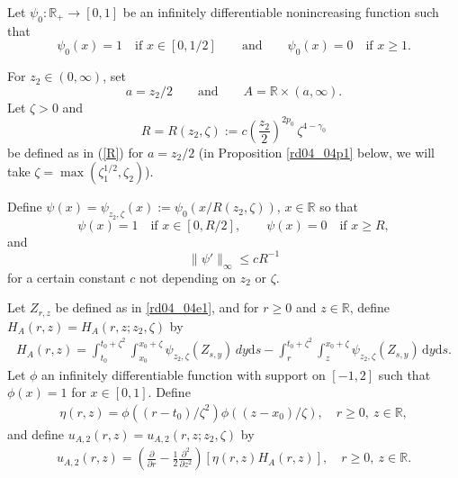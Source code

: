 \documentclass[12pt,a4paper]{article}
\newcommand{\R}{{\mathbb{R}}}
\renewcommand{\d}{\mathrm{d}}
\newcommand {\deltah}{{\zeta}}
\newcommand{\<}{\langle}
\renewcommand{\>}{\rangle}
\begin{document}
 Let $\psi_0:\mathbb{R}_+ \rightarrow [0,1]$ be an infinitely differentiable nonincreasing function such that
 \[
 \psi_0(x)= 1 \quad\text{if } x \in [0, 1/2] \qquad\text{and}\qquad \psi_0(x)= 0 \quad\text{if } x \geq 1.
 \]
 
 For $z_2\in (0,\infty)$, set 
 \begin{equation}\label{rd04_04e2}
      a=z_2/2\qquad \text{and}\qquad A=\R \times (a,\infty).
 \end{equation}
 Let $\zeta > 0$ and
 \begin{equation}\label{rd08_04e2}
    R=R(z_2,\deltah) := c \left(\frac{z_2}{2}\right)^{2 p_0}\, \zeta^{4 - \gamma_0}
  \end{equation}
 be defined as in (\ref{R}) for $a=z_2/2$ (in Proposition \ref{rd04_04p1} below, we will take $\zeta=\max(\zeta_1^{1/2}, \zeta_2)$).
 
 Define $\psi(x) = \psi_{z_2,\deltah}(x) := \psi_0(x/R(z_2, \deltah))$, $x\in \mathbb{R}$ so that
  \[
 \psi(x)= 1 \quad\text{if } x \in [0, R/2], \qquad \psi(x)= 0 \quad\text{if } x \geq R,
 \]
 and 
 \begin{equation}\label{rd07_02e1}
    \|\psi'\|_\infty \le cR^{-1}
\end{equation}
for a certain constant $c$ not depending on $z_2$ or $\deltah$.

Let $Z_{r, z}$ be defined as in \eqref{rd04_04e1}, and for $r\geq0$ and $z\in \R$, define $H_A(r, z) = H_A(r, z; z_2, \deltah)$ by
 \begin{align}\label{eq:H}
 H_A(r,z)= \int_{t_0}^{t_0+\deltah^2}\int_{x_0}^{x_0+\deltah}\psi_{z_2, \deltah}(Z_{s,y})\, d y\d s- \int_{r}^{t_0+\deltah^2}\int_{z}^{x_0+\deltah}\psi_{z_2, \deltah}(Z_{s,y})\, \d y\d s. 
 \end{align}
 Let $\phi$ an infinitely differentiable function with support on $[-1,2]$ such that $\phi(x)=1$ for $x \in [0,1]$.
Define 
\begin{align}\label{eq:eta}
\eta(r, z)= \phi\left((r-t_0)/\deltah^2\right) \phi\left((z-x_0)/\deltah\right), \quad r\geq0,\ z\in \R,
\end{align}
and define $u_{A,2}(r, z) = u_{A,2}(r, z; z_2, \deltah)$ by
\begin{align}\label{rd07_01e2}
 u_{A,2}(r, z)= \left(\frac{\partial }{\partial r}-\frac 12 \frac{\partial^2}{\partial z^2}\right)[\eta(r,z)H_A(r,z)], \quad r\geq0,\ z\in \R.
 \end{align} 
 
\end{document}
